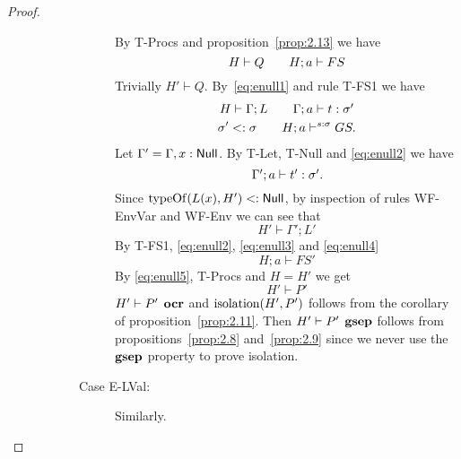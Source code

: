 \begin{proof}
\begin{description}
\begin{description}
\begin{description}
              By {\sc T-Procs} and proposition~\ref{prop:2.13} we have 
              \begin{equation} \label{eq:enull1}
               H \vdash Q  \quad\quad H; a \vdash FS 
              \end{equation}
              Trivially $H' \vdash Q$. 
              By~\eqref{eq:enull1} and rule {\sc T-FS1} we have
              \begin{equation} \label{eq:enull2}
                \begin{gathered}
                  H \vdash \Gamma; L \quad\quad \mbox{$\Gamma;a\vdash t:\sigma'$} \\
                  \sigma' <: \sigma \quad\quad H; a \vdash^{s: \sigma} GS.
                \end{gathered}
              \end{equation}
              Let $\Gamma' = \Gamma, x: \mbox{$\mathsf{Null}$}$. By {\sc T-Let}, {\sc
              T-Null} and \eqref{eq:enull2} we have
              \begin{equation} \label{eq:enull3}
                \mbox{$\Gamma';a\vdash t':\sigma'$}.
              \end{equation}
              Since $\mbox{$\mathrm{typeOf}$}(L(x), H') <: \mbox{$\mathsf{Null}$}$, by inspection of rules
              {\sc WF-EnvVar} and {\sc WF-Env} we can see that
              \begin{equation} \label{eq:enull4}
                H' \vdash \Gamma';L'
              \end{equation}
              By {\sc T-FS1}, \eqref{eq:enull2}, \eqref{eq:enull3} and \eqref{eq:enull4}
              \begin{equation}\label{eq:enull5}
                H;a \vdash FS'
              \end{equation}
              By \eqref{eq:enull5}, {\sc T-Procs} and $H = H'$ we get  
              \begin{equation}
                H' \vdash P'
              \end{equation}
              $H' \vdash P' \:\: \mbox{\bf ocr}$ and $\mbox{$\mathrm{isolation}$}{(H', P')}$ follows from
              the corollary of proposition~\ref{prop:2.11}. Then $H' \vdash P'
              \:\: \mbox{\bf gsep}$ follows from propositions~\ref{prop:2.8}
              and~\ref{prop:2.9} since we never use the $\mbox{\bf gsep}$ property to
              prove isolation.

            \item[Case {\sc E-LVal}:] Similarly.


\end{description}
\end{description}
\end{description}
\end{proof}
